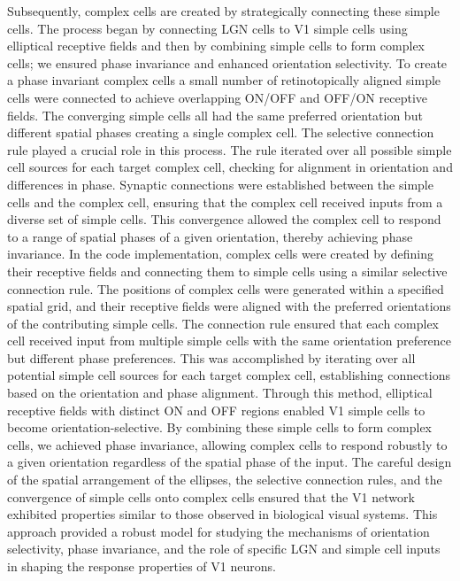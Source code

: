 \documentclass[12pt]{article}
\begin{document}
Subsequently, complex cells are created by strategically connecting these simple cells. The process began by connecting LGN cells to V1 simple cells using elliptical receptive fields and then by combining simple cells to form complex cells; we ensured phase invariance and enhanced orientation selectivity. To create a phase invariant complex cells a small number of retinotopically aligned simple cells were connected to achieve overlapping ON/OFF and OFF/ON receptive fields. The converging simple cells all had the same preferred orientation but different spatial phases creating a single complex cell. The selective connection rule played a crucial role in this process. The rule iterated over all possible simple cell sources for each target complex cell, checking for alignment in orientation and differences in phase. Synaptic connections were established between the simple cells and the complex cell, ensuring that the complex cell received inputs from a diverse set of simple cells. This convergence allowed the complex cell to respond to a range of spatial phases of a given orientation, thereby achieving phase invariance.
\bigbreak
In the code implementation, complex cells were created by defining their receptive fields and connecting them to simple cells using a similar selective connection rule. The positions of complex cells were generated within a specified spatial grid, and their receptive fields were aligned with the preferred orientations of the contributing simple cells. The connection rule ensured that each complex cell received input from multiple simple cells with the same orientation preference but different phase preferences. This was accomplished by iterating over all potential simple cell sources for each target complex cell, establishing connections based on the orientation and phase alignment. Through this method, elliptical receptive fields with distinct ON and OFF regions enabled V1 simple cells to become orientation-selective. By combining these simple cells to form complex cells, we achieved phase invariance, allowing complex cells to respond robustly to a given orientation regardless of the spatial phase of the input. The careful design of the spatial arrangement of the ellipses, the selective connection rules, and the convergence of simple cells onto complex cells ensured that the V1 network exhibited properties similar to those observed in biological visual systems. This approach provided a robust model for studying the mechanisms of orientation selectivity, phase invariance, and the role of specific LGN and simple cell inputs in shaping the response properties of V1 neurons.
\end{document}
